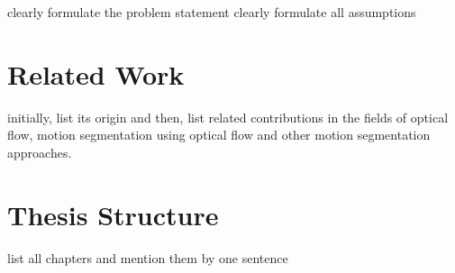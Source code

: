 clearly formulate the problem statement
clearly formulate all assumptions

\section{Related Work}
initially, list its origin and then, list related contributions in the fields of optical flow, motion segmentation using optical flow and other motion segmentation approaches. 

\section{Thesis Structure}

list all chapters and mention them by one sentence